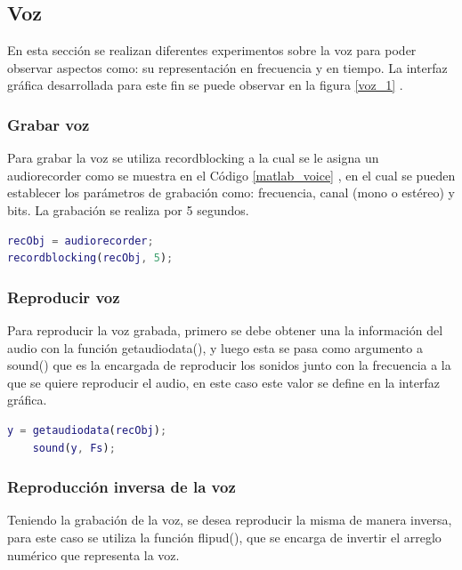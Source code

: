 \documentclass[comsoc, journal]{IEEEtran}
\begin{document}
\subsection{Voz}
En esta sección se realizan diferentes experimentos sobre la voz para poder observar aspectos como: su representación en frecuencia y en tiempo. La interfaz gráfica desarrollada para este fin se puede observar en la figura \ref{voz_1} . 

\subsubsection{Grabar voz}

Para grabar la voz se utiliza recordblocking a la cual se le asigna un audiorecorder como se muestra en el Código \ref{matlab_voice} , en el cual se pueden establecer los parámetros de grabación como: frecuencia, canal (mono o estéreo) y bits. La grabación se realiza por 5 segundos.

\begin{lstlisting}[caption={Grabar voz},label={matlab_voice},language=Matlab]
recObj = audiorecorder;
recordblocking(recObj, 5);
\end{lstlisting}

\subsubsection{Reproducir voz}

Para reproducir la voz grabada, primero se debe obtener una la información del  audio con la función  getaudiodata(), y luego esta se pasa como argumento a sound() que es la encargada de reproducir los sonidos junto con la frecuencia a la que se quiere reproducir el audio, en este caso este valor se define en la interfaz gráfica. 

\begin{lstlisting}[caption={Reproducir sonido},label={matlab_playsound},language=Matlab]
	y = getaudiodata(recObj);    
    sound(y, Fs);
\end{lstlisting}

\subsubsection{Reproducción inversa de la voz}

Teniendo la grabación de la voz, se desea reproducir la misma de manera inversa, para este caso se utiliza la función flipud(), que se encarga de invertir el arreglo numérico que representa la voz.
\end{document}
